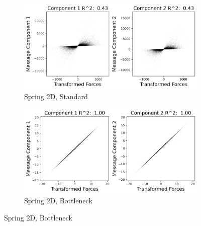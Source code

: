 \documentclass[11pt]{article}
\begin{document}
    \begin{figure}[H]
        \centering
        \begin{subfigure}{0.45\textwidth}
            \includegraphics[width=\textwidth]{figs/spring_2d_standard_r2.png}
            \caption{Spring 2D, Standard}
        \end{subfigure}
        \begin{subfigure}{0.45\textwidth}
            \includegraphics[width=\textwidth]{figs/spring_2d_bottleneck_r2.png}
            \caption{Spring 2D, Bottleneck}
        \end{subfigure}
        

\end{figure}
\end{document}
